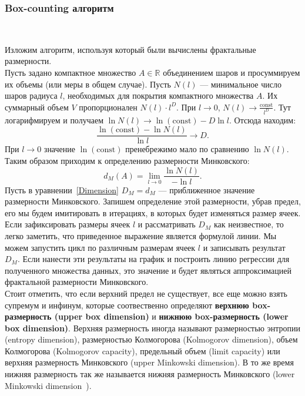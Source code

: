 \subsubsection{Box-counting алгоритм}
~\par
Изложим алгоритм, используя который были вычислены фрактальные размерности.\\
Пусть задано компактное множество $A \in \mathbb{R}$ объединением шаров и просуммируем их объемы (или меры в общем случае). Пусть $N(l)$ --- минимальное число шаров радиуса $l$, необходимых для покрытия компактного множества $A$. Их суммарный объем $V$ пропорционален $N(l)\cdot l^D$. При $l \to 0$, $N(l) \to \frac{\text{const}}{l^D}$. Тут логарифмируем и получаем $\ln N(l) \to \ln(\text{const}) - D\ln l$. Отсюда находим: 
$$
\frac{\ln(\text{const}) - \ln N(l)}{\ln l} \to D.
$$
При $l \to 0$ значение $\ln(\text{const})$ пренебрежимо мало по сравнению $\ln N(l)$. Таким образом приходим к определению размерности Минковского:
\begin{equation}\label{Dimension}
d_M(A) =  \lim_{l \to 0} \frac{\ln N(l)}{-\ln l}.
\end{equation}
Пусть в уравнении~\ref{Dimension} $D_M = d_M$ --- приближенное значение размерности Минковского. Запишем определение этой размерности, убрав предел, его мы будем имитировать в итерациях, в которых будет изменяться размер ячеек. Если зафиксировать размеры ячеек $l$ и рассматривать $D_M$ как неизвестное, то легко заметить, что приведенное выражение является формулой линии. Мы можем запустить цикл по различным размерам ячеек $l$ и записывать результат $D_M$. Если нанести эти результаты на график и построить линию регрессии для полученного множества данных, это значение и будет являться аппроксимацией фрактальной размерности Минковского.\\

Стоит отметить, что если верхний предел не существует, все еще можно взять супремум и инфинум, которые соотвественно определяют \textbf{верхнюю box-размерность (upper box dimension)} и \textbf{нижнюю box-размерность (lower box dimension)}. Верхняя размерность иногда называют размерностью энтропии (entropy dimension),  размерностью Колмогорова (Kolmogorov dimension), объем Колмогорова (Kolmogorov capacity), предельный объем (limit capacity) или верхняя размерность Минковского (upper Minkowski dimension). В то же время нижняя размерность так же называется нижняя размерность Минковского (lower Minkowski dimension~\cite{MINKOWSKI}).\\
